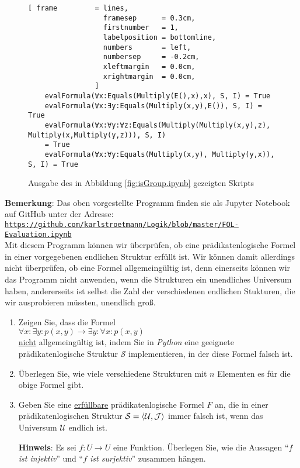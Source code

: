 \begin{figure}[!ht]
\centering
\begin{Verbatim}[ frame         = lines, 
                  framesep      = 0.3cm, 
                  firstnumber   = 1,
                  labelposition = bottomline,
                  numbers       = left,
                  numbersep     = -0.2cm,
                  xleftmargin   = 0.0cm,
                  xrightmargin  = 0.0cm,
                ]
    evalFormula(∀x:Equals(Multiply(E(),x),x), S, I) = True
    evalFormula(∀x:∃y:Equals(Multiply(x,y),E()), S, I) = True
    evalFormula(∀x:∀y:∀z:Equals(Multiply(Multiply(x,y),z), Multiply(x,Multiply(y,z))), S, I)
    = True
    evalFormula(∀x:∀y:Equals(Multiply(x,y), Multiply(y,x)), S, I) = True
\end{Verbatim}
\vspace*{-0.3cm}
\caption{Ausgabe des in Abbildung \ref{fig:isGroup.ipynb} gezeigten Skripts}
\label{fig:isGroup.out}
\end{figure}

\noindent
\textbf{Bemerkung}:  Das oben vorgestellte Programm finden sie als Jupyter Notebook auf GitHub unter der Adresse:
\\[0.2cm]
\hspace*{0.8cm}
\href{https://github.com/karlstroetmann/Logik/blob/master/Python/FOL-Evaluation.ipynb}{\texttt{https://github.com/karlstroetmann/Logik/blob/master/FOL-Evaluation.ipynb}}
\\[0.2cm]
Mit diesem Programm können wir überprüfen, ob eine
prädikatenlogische Formel in einer vorgegebenen endlichen Struktur erfüllt ist. Wir können damit
allerdings nicht überprüfen, ob eine Formel allgemeingültig ist, denn einerseits können
wir das Programm nicht anwenden, wenn die Strukturen ein unendliches Universum haben,
andererseits ist selbst die Zahl der verschiedenen endlichen Stukturen, die wir ausprobieren
müssten, unendlich groß.  \eox

\exercise
\begin{enumerate}
\item Zeigen Sie, dass die Formel
      \\[0.2cm]
      \hspace*{1.3cm}
      $\forall x: \exists y: p(x,y) \rightarrow \exists y: \forall x: p(x,y)$
      \\[0.2cm]
      \underline{nicht} allgemeingültig ist, indem Sie in \textsl{Python} eine geeignete
      prädikatenlogische Struktur $\mathcal{S}$ implementieren, in der diese Formel falsch ist.
\item Überlegen Sie, wie viele verschiedene Strukturen mit $n$ Elementen es für die obige Formel gibt.
\item Geben Sie eine \underline{erfüllbare} prädikatenlogische Formel $F$ an, die in einer prädikatenlogischen
      Struktur $\mathcal{S} = \pair(\mathcal{U},\mathcal{J})$ immer falsch ist, wenn das Universum
      $\mathcal{U}$ endlich ist.

      \textbf{Hinweis}: Es sei $f:U \rightarrow U$ eine Funktion.  Überlegen Sie, wie die Aussagen
      ``\emph{$f$ ist injektiv}'' und ``\emph{$f$ ist surjektiv}'' zusammen hängen.
      \exend  
\end{enumerate}

